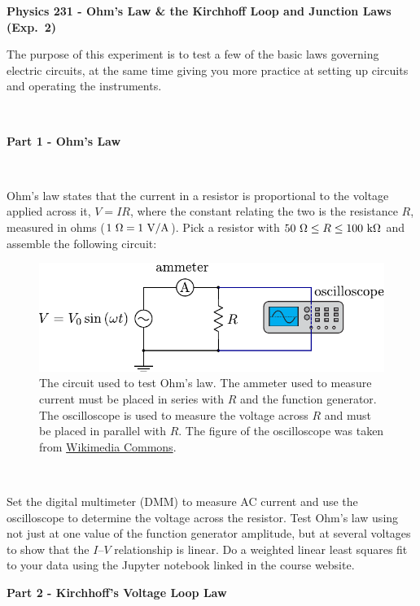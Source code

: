 \documentclass[12pt,oneside,openany,letterpaper]{article}
\begin{document}
\thispagestyle{plain}
\begin{center}
{\large{\bf{\selectfont Physics 231 - Ohm's Law \& the Kirchhoff Loop and Junction Laws  (Exp.~2)}}}
\end{center}

\noindent The purpose of this experiment is to test a few of the basic laws governing electric circuits, at the same time giving you more practice at setting up circuits and operating the instruments.

~


{\bf Part 1 - Ohm's Law}

~

\noindent Ohm’s law states that the current in a resistor is proportional to the voltage applied across it, $V = IR$, where the constant relating the two is the resistance $R$, measured in ohms ($1\rm\ \Omega = 1\rm\ V/A$). Pick a resistor with $50~\Omega\le R\le 100\rm\ k\Omega$ and assemble the following circuit:
\begin{figure}[h!]
\begin{center}
\includegraphics[width=.7\textwidth]{figures/Lab2Fig1.pdf}\caption{\label{fig:fig1}The circuit used to test Ohm's law.  The ammeter used to measure current must be placed in series with $R$ and the function generator.  The oscilloscope is used to measure the voltage across $R$ and must be placed in parallel with $R$.  The figure of the oscilloscope was taken from \href{https://commons.wikimedia.org/wiki/File:Symbol_oscilloscope.svg}{Wikimedia Commons}.}
\end{center}
\end{figure}

~

\noindent Set the digital multimeter (DMM) to measure AC current and use the oscilloscope to determine the voltage across the resistor. Test Ohm’s law using not just at one value of the function generator amplitude, but at several voltages to show that the $I$–$V$ relationship is linear. Do a weighted linear least squares fit to your data using the Jupyter notebook linked in the course website.


\clearpage


{\bf Part 2 - Kirchhoff's Voltage Loop Law}
\end{document}

